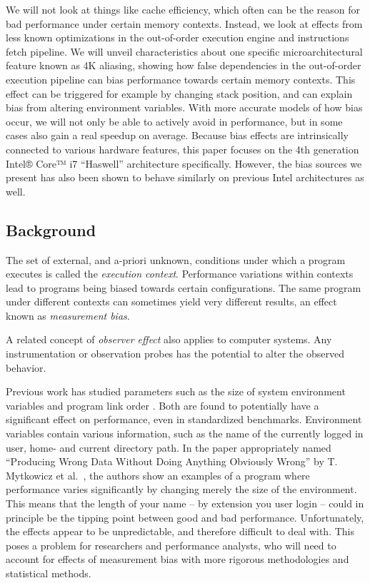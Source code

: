 \documentclass[a4paper,10pt,twocolumn,twoside]{article}
\begin{document}
We will not look at things like cache efficiency, which often can be the reason for bad performance under certain memory contexts. 
Instead, we look at effects from less known optimizations in the out-of-order execution engine and instructions fetch pipeline. 
We will unveil characteristics about one specific microarchitectural feature known as 4K aliasing, showing how false dependencies in the out-of-order execution pipeline can bias performance towards certain memory contexts. 
This effect can be triggered for example by changing stack position, and can explain bias from altering environment variables.
With more accurate models of how bias occur, we will not only be able to actively avoid in performance, but in some cases also gain a real speedup on average.
Because bias effects are intrinsically connected to various hardware features, this paper focuses on the 4th generation Intel® Core™ i7 ``Haswell'' architecture specifically. 
However, the bias sources we present has also been shown to behave similarly on previous Intel architectures as well.


\subsection{Background}
The set of external, and a-priori unknown, conditions under which a program executes is called the \emph{execution context}. 
Performance variations within contexts lead to programs being biased towards certain configurations. 
The same program under different contexts can sometimes yield very different results, an effect known as \emph{measurement bias}.

A related concept of \emph{observer effect} also applies to computer systems.
Any instrumentation or observation probes has the potential to alter the observed behavior.

Previous work has studied parameters such as the size of system environment variables and program link order \cite{Mytkowicz:2008:OE&MB}. 
Both are found to potentially have a significant effect on performance, even in standardized benchmarks. 
Environment variables contain various information, such as the name of the currently logged in user, home- and current directory path.
In the paper appropriately named ``Producing Wrong Data Without Doing Anything Obviously Wrong'' by T. Mytkowicz et al.~\cite{Mytkowicz:2009:WrongData}, the authors show an examples of a program where performance varies significantly by changing merely the size of the environment. 
This means that the length of your name -- by extension you user login -- could in principle be the tipping point between good and bad performance.
Unfortunately, the effects appear to be unpredictable, and therefore difficult to deal with. 
This poses a problem for researchers and performance analysts, who will need to account for effects of measurement bias with more rigorous methodologies and statistical methods.
\end{document}
